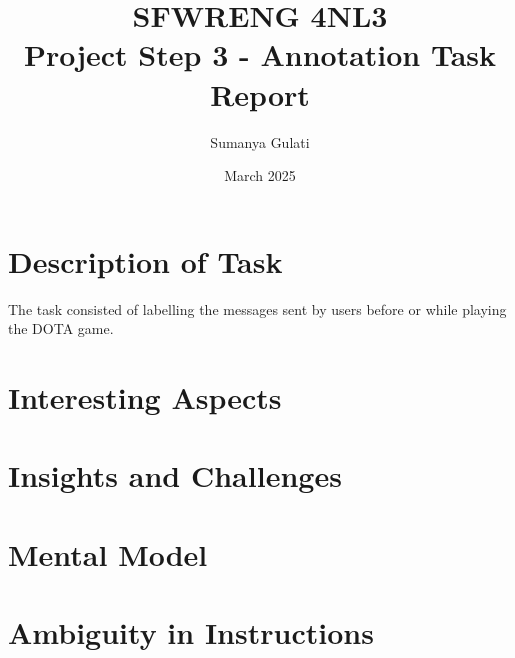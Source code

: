 \documentclass[titlepage]{article}
\title{SFWRENG 4NL3\\ Project Step 3 - Annotation Task Report}
\author{Sumanya Gulati}
\date{March 2025}
\begin{document}
\begin{titlepage}
    \maketitle
\end{titlepage}

\newpage

\section{Description of Task}
The task consisted of labelling the  messages sent by users before or while playing
the DOTA game. 

\section{Interesting Aspects}

\section{Insights and Challenges}

\section{Mental Model}

\section{Ambiguity in Instructions}
\end{document}
